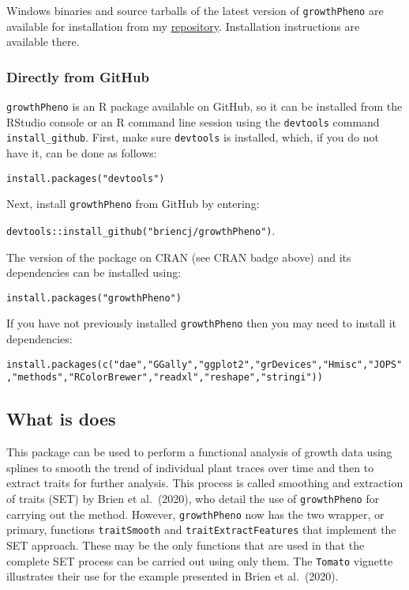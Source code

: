 \documentclass[
]{article}
\begin{document}
Windows binaries and source tarballs of the latest version of
\texttt{growthPheno} are available for installation from my
\href{http://chris.brien.name/rpackages}{repository}. Installation
instructions are available there.

\hypertarget{directly-from-github}{%
\subsubsection{Directly from GitHub}\label{directly-from-github}}

\texttt{growthPheno} is an R package available on GitHub, so it can be
installed from the RStudio console or an R command line session using
the \texttt{devtools} command \texttt{install\_github}. First, make sure
\texttt{devtools} is installed, which, if you do not have it, can be
done as follows:

\texttt{install.packages("devtools")}

Next, install \texttt{growthPheno} from GitHub by entering:

\texttt{devtools::install\_github("briencj/growthPheno")}.

The version of the package on CRAN (see CRAN badge above) and its
dependencies can be installed using:

\texttt{install.packages("growthPheno")}

If you have not previously installed \texttt{growthPheno} then you may
need to install it dependencies:

\texttt{install.packages(c("dae","GGally","ggplot2","grDevices","Hmisc","JOPS","methods","RColorBrewer","readxl","reshape","stringi"))}

\hypertarget{what-is-does}{%
\subsection{What is does}\label{what-is-does}}

This package can be used to perform a functional analysis of growth data
using splines to smooth the trend of individual plant traces over time
and then to extract traits for further analysis. This process is called
smoothing and extraction of traits (SET) by Brien et al.~(2020), who
detail the use of \texttt{growthPheno} for carrying out the method.
However, \texttt{growthPheno} now has the two wrapper, or primary,
functions \texttt{traitSmooth} and \texttt{traitExtractFeatures} that
implement the SET approach. These may be the only functions that are
used in that the complete SET process can be carried out using only
them. The \texttt{Tomato} vignette illustrates their use for the example
presented in Brien et al.~(2020).
\end{document}
